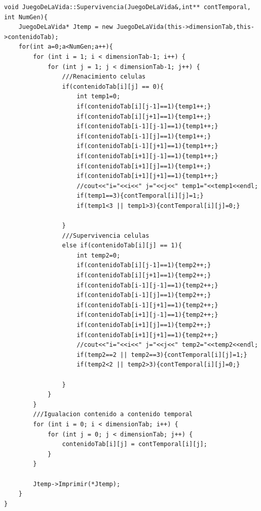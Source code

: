 \documentclass[12pt,letterpaper]{article}
\begin{document}
\begin{lstlisting}
void JuegoDeLaVida::Supervivencia(JuegoDeLaVida&,int** contTemporal, int NumGen){
    JuegoDeLaVida* Jtemp = new JuegoDeLaVida(this->dimensionTab,this->contenidoTab);
    for(int a=0;a<NumGen;a++){
        for (int i = 1; i < dimensionTab-1; i++) {
            for (int j = 1; j < dimensionTab-1; j++) {
                ///Renacimiento celulas 
                if(contenidoTab[i][j] == 0){
                    int temp1=0;
                    if(contenidoTab[i][j-1]==1){temp1++;}
                    if(contenidoTab[i][j+1]==1){temp1++;}
                    if(contenidoTab[i-1][j-1]==1){temp1++;}
                    if(contenidoTab[i-1][j]==1){temp1++;}
                    if(contenidoTab[i-1][j+1]==1){temp1++;}
                    if(contenidoTab[i+1][j-1]==1){temp1++;}
                    if(contenidoTab[i+1][j]==1){temp1++;}
                    if(contenidoTab[i+1][j+1]==1){temp1++;}
                    //cout<<"i="<<i<<" j="<<j<<" temp1="<<temp1<<endl;
                    if(temp1==3){contTemporal[i][j]=1;}
                    if(temp1<3 || temp1>3){contTemporal[i][j]=0;}

                }
                ///Supervivencia celulas
                else if(contenidoTab[i][j] == 1){
                    int temp2=0;
                    if(contenidoTab[i][j-1]==1){temp2++;}
                    if(contenidoTab[i][j+1]==1){temp2++;}
                    if(contenidoTab[i-1][j-1]==1){temp2++;}
                    if(contenidoTab[i-1][j]==1){temp2++;}
                    if(contenidoTab[i-1][j+1]==1){temp2++;}
                    if(contenidoTab[i+1][j-1]==1){temp2++;}
                    if(contenidoTab[i+1][j]==1){temp2++;}
                    if(contenidoTab[i+1][j+1]==1){temp2++;}
                    //cout<<"i="<<i<<" j="<<j<<" temp2="<<temp2<<endl;
                    if(temp2==2 || temp2==3){contTemporal[i][j]=1;}
                    if(temp2<2 || temp2>3){contTemporal[i][j]=0;}

                }
            }
        }
        ///Igualacion contenido a contenido temporal
        for (int i = 0; i < dimensionTab; i++) {
            for (int j = 0; j < dimensionTab; j++) {
                contenidoTab[i][j] = contTemporal[i][j];
            }
        }
        
        Jtemp->Imprimir(*Jtemp);
	}
}


\end{lstlisting}
\end{document}
